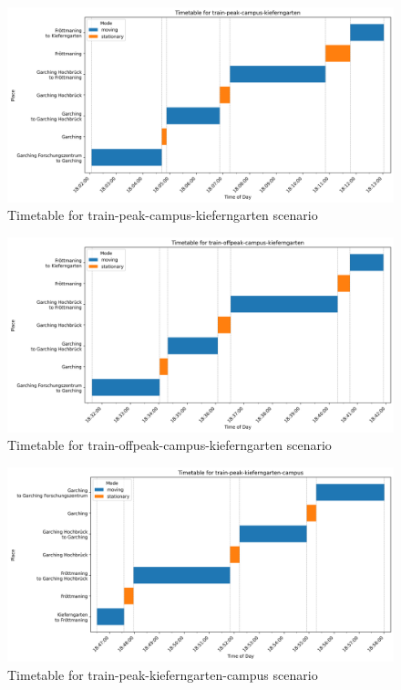 \documentclass[sigconf,nonacm]{acmart}
\begin{document}
\begin{figure}
    \centering
    \includegraphics[width=\columnwidth]{images/part1/timetables/timetable-train-peak-campus-kieferngarten.png}
    \caption{Timetable for train-peak-campus-kieferngarten scenario}
    \label{fig:timetable-train-peak-campus-kieferngarten}
\end{figure}

\begin{figure}
    \centering
    \includegraphics[width=\columnwidth]{images/part1/timetables/timetable-train-offpeak-campus-kieferngarten.png}
    \caption{Timetable for train-offpeak-campus-kieferngarten scenario}
    \label{fig:timetable-train-offpeak-campus-kieferngarten}
\end{figure}

\begin{figure}
    \centering
    \includegraphics[width=\columnwidth]{images/part1/timetables/timetable-train-peak-kieferngarten-campus.png}
    \caption{Timetable for train-peak-kieferngarten-campus scenario}
    \label{fig:timetable-train-peak-kieferngarten-campus}
\end{figure}
\end{document}
